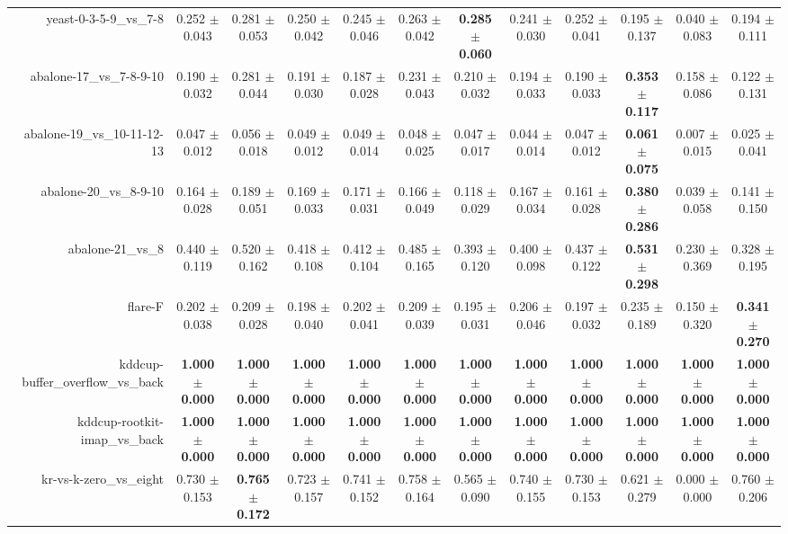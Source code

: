 \begin{table}[!ht]
{\begin{tabular}{r c c c c c c c c c c c}
yeast-0-3-5-9\_vs\_7-8 & 0.252 $\pm$ 0.043 & 0.281 $\pm$ 0.053 & 0.250 $\pm$ 0.042 & 0.245 $\pm$ 0.046 & 0.263 $\pm$ 0.042 & \textbf{0.285 $\pm$ 0.060} & 0.241 $\pm$ 0.030 & 0.252 $\pm$ 0.041 & 0.195 $\pm$ 0.137 & 0.040 $\pm$ 0.083 & 0.194 $\pm$ 0.111 \\
abalone-17\_vs\_7-8-9-10 & 0.190 $\pm$ 0.032 & 0.281 $\pm$ 0.044 & 0.191 $\pm$ 0.030 & 0.187 $\pm$ 0.028 & 0.231 $\pm$ 0.043 & 0.210 $\pm$ 0.032 & 0.194 $\pm$ 0.033 & 0.190 $\pm$ 0.033 & \textbf{0.353 $\pm$ 0.117} & 0.158 $\pm$ 0.086 & 0.122 $\pm$ 0.131 \\
abalone-19\_vs\_10-11-12-13 & 0.047 $\pm$ 0.012 & 0.056 $\pm$ 0.018 & 0.049 $\pm$ 0.012 & 0.049 $\pm$ 0.014 & 0.048 $\pm$ 0.025 & 0.047 $\pm$ 0.017 & 0.044 $\pm$ 0.014 & 0.047 $\pm$ 0.012 & \textbf{0.061 $\pm$ 0.075} & 0.007 $\pm$ 0.015 & 0.025 $\pm$ 0.041 \\
abalone-20\_vs\_8-9-10 & 0.164 $\pm$ 0.028 & 0.189 $\pm$ 0.051 & 0.169 $\pm$ 0.033 & 0.171 $\pm$ 0.031 & 0.166 $\pm$ 0.049 & 0.118 $\pm$ 0.029 & 0.167 $\pm$ 0.034 & 0.161 $\pm$ 0.028 & \textbf{0.380 $\pm$ 0.286} & 0.039 $\pm$ 0.058 & 0.141 $\pm$ 0.150 \\
abalone-21\_vs\_8 & 0.440 $\pm$ 0.119 & 0.520 $\pm$ 0.162 & 0.418 $\pm$ 0.108 & 0.412 $\pm$ 0.104 & 0.485 $\pm$ 0.165 & 0.393 $\pm$ 0.120 & 0.400 $\pm$ 0.098 & 0.437 $\pm$ 0.122 & \textbf{0.531 $\pm$ 0.298} & 0.230 $\pm$ 0.369 & 0.328 $\pm$ 0.195 \\
flare-F & 0.202 $\pm$ 0.038 & 0.209 $\pm$ 0.028 & 0.198 $\pm$ 0.040 & 0.202 $\pm$ 0.041 & 0.209 $\pm$ 0.039 & 0.195 $\pm$ 0.031 & 0.206 $\pm$ 0.046 & 0.197 $\pm$ 0.032 & 0.235 $\pm$ 0.189 & 0.150 $\pm$ 0.320 & \textbf{0.341 $\pm$ 0.270} \\
kddcup-buffer\_overflow\_vs\_back & \textbf{1.000 $\pm$ 0.000} & \textbf{1.000 $\pm$ 0.000} & \textbf{1.000 $\pm$ 0.000} & \textbf{1.000 $\pm$ 0.000} & \textbf{1.000 $\pm$ 0.000} & \textbf{1.000 $\pm$ 0.000} & \textbf{1.000 $\pm$ 0.000} & \textbf{1.000 $\pm$ 0.000} & \textbf{1.000 $\pm$ 0.000} & \textbf{1.000 $\pm$ 0.000} & \textbf{1.000 $\pm$ 0.000} \\
kddcup-rootkit-imap\_vs\_back & \textbf{1.000 $\pm$ 0.000} & \textbf{1.000 $\pm$ 0.000} & \textbf{1.000 $\pm$ 0.000} & \textbf{1.000 $\pm$ 0.000} & \textbf{1.000 $\pm$ 0.000} & \textbf{1.000 $\pm$ 0.000} & \textbf{1.000 $\pm$ 0.000} & \textbf{1.000 $\pm$ 0.000} & \textbf{1.000 $\pm$ 0.000} & \textbf{1.000 $\pm$ 0.000} & \textbf{1.000 $\pm$ 0.000} \\
kr-vs-k-zero\_vs\_eight & 0.730 $\pm$ 0.153 & \textbf{0.765 $\pm$ 0.172} & 0.723 $\pm$ 0.157 & 0.741 $\pm$ 0.152 & 0.758 $\pm$ 0.164 & 0.565 $\pm$ 0.090 & 0.740 $\pm$ 0.155 & 0.730 $\pm$ 0.153 & 0.621 $\pm$ 0.279 & 0.000 $\pm$ 0.000 & 0.760 $\pm$ 0.206 \\

\end{tabular}}
\end{table}
